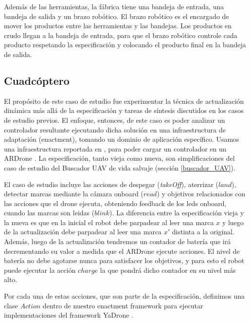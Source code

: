 Además de las herramientas, la fábrica tiene una bandeja de entrada, una bandeja de salida y un brazo robótico. El brazo
robótico es el encargado de mover los productos entre las herramientas y las bandejas. Los productos en crudo llegan a
la bandeja de entrada, para que el brazo robótico controle cada producto respetando la especificación y colocando el
producto final en la bandeja de salida.

\subsection{Cuadcóptero}

El propósito de este caso de estudio fue experimentar la técnica de actualización dinámica más allá de la especificación
y tareas de síntesis discutidos en los casos de estudio previos. El enfoque, entonces, de este caso es poder analizar un
controlador resultante ejecutando dicha solución en una infraestructura de adaptación (enactment), tomando un dominio de
aplicación específico. Usamos una infraestructura reportada en \cite{Braberman:2013:CSM:2486788.2487002}, para poder
cargar un controlador en un ARDrone \cite{ARDrone}. La especificación, tanto vieja como nueva, son
simplificaciones del caso de estudio del Buscador UAV de vida salvaje (sección \ref{buscador_UAV}). 

El caso de estudio incluye las acciones de despegar (\emph{takeOff}), aterrizar ($land$), detectar marcas mediante la cámara
onboard ($read$) y objetivos relacionados con las acciones que el drone ejecuta, obteniendo feedback de los leds
onboard, cuando las marcas son leidas ($blink$). La diferencia entre la especificación vieja y la nueva es que en la inicial el
robot debe parpadear al leer una marca $x$ y luego de la actualización debe parpadear al leer una marca $x'$ distinta a
la original. Además, luego de la actualización tendremos un contador de batería que irá decrementando su valor a medida
que el ARDrone ejecute acciones. El nivel de batería no debe agotarse nunca para satisfacer los objetivos, y para esto
el robot puede ejecutar la acción $charge$ la que pondrá dicho contador en su nivel más alto.

Por cada una de estas acciones, que son parte de la especificación, definimos una clase $Action$ dentro de nuestro
enactment framework para ejecutar implementaciones del framework YaDrone \cite{YaDrone}.



